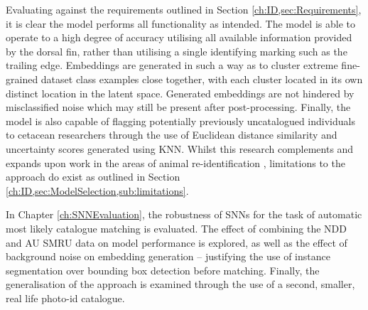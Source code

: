 Evaluating against the requirements outlined in Section \ref{ch:ID,sec:Requirements}, it is clear the model performs all functionality as intended. The model is able to operate to a high degree of accuracy utilising all available information provided by the dorsal fin, rather than utilising a single identifying marking such as the trailing edge. Embeddings are generated in such a way as to cluster extreme fine-grained dataset class examples close together, with each cluster located in its own distinct location in the latent space. Generated embeddings are not hindered by misclassified noise which may still be present after post-processing. Finally, the model is also capable of flagging potentially previously uncatalogued individuals to cetacean researchers through the use of Euclidean distance similarity and uncertainty scores generated using KNN. Whilst this research complements and expands upon work in the areas of animal re-identification \cite{vetrova_hidden_2018, clapham_automated_2020, birenbaum_sealnet_2022}, limitations to the approach do exist as outlined in Section \ref{ch:ID,sec:ModelSelection,sub:limitations}. 

In Chapter \ref{ch:SNNEvaluation}, the robustness of SNNs for the task of automatic most likely catalogue matching is evaluated. The effect of combining the NDD and AU SMRU data on model performance is explored, as well as the effect of background noise on embedding generation -- justifying the use of instance segmentation over bounding box detection before matching. Finally, the generalisation of the approach is examined through the use of a second, smaller, real life photo-id catalogue. 

